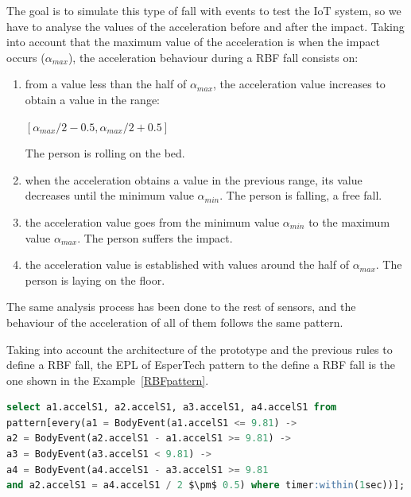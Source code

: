 \documentclass[review]{elsarticle}
\begin{document}
The goal is to simulate this type of fall with events to test the IoT system, so we have to analyse the values of 
the acceleration before and after the impact. Taking into account that the maximum value of the acceleration is 
when the impact occurs ($\alpha_{max}$), the acceleration behaviour during a RBF fall consists on:
\begin{enumerate}
 \item from a value less than the half of $\alpha_{max}$, the acceleration value increases to obtain a value in the range:
  \begin{center}
  $[\alpha_{max}/2 - 0.5, \alpha_{max}/2 + 0.5]$
  \end{center}
 The person is rolling on the bed.
 \item when the acceleration obtains a value in the previous range, its value decreases until the minimum value $\alpha_{min}$.
 The person is falling, a free fall.
 \item the acceleration value goes from the minimum value $\alpha_{min}$ to the maximum value $\alpha_{max}$. The person
 suffers the impact.
 \item the acceleration value is established with values around the half of $\alpha_{max}$. The person is laying on the floor. 
\end{enumerate}

The same analysis process has been done to the rest of sensors, and the behaviour of the acceleration of all of them 
follows the same pattern.

Taking into account the architecture of the prototype and the previous rules to define a RBF fall, the EPL of EsperTech
pattern to the define a RBF fall is the one shown in the Example~\ref{RBFpattern}.

\begin{lstlisting}[basicstyle=\ttfamily\footnotesize,language=SQL, mathescape,caption=RBF pattern,label=RBFpattern]
select a1.accelS1, a2.accelS1, a3.accelS1, a4.accelS1 from 
pattern[every(a1 = BodyEvent(a1.accelS1 <= 9.81) -> 
a2 = BodyEvent(a2.accelS1 - a1.accelS1 >= 9.81) ->
a3 = BodyEvent(a3.accelS1 < 9.81) ->
a4 = BodyEvent(a4.accelS1 - a3.accelS1 >= 9.81 
and a2.accelS1 = a4.accelS1 / 2 $\pm$ 0.5) where timer:within(1sec))];
\end{lstlisting}
\end{document}

